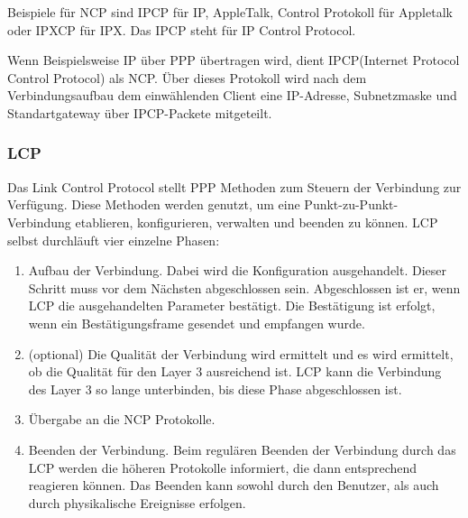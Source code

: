 \documentclass[12pt, a4paper, ngerman]{article}
\begin{document}
Beispiele für NCP sind IPCP für IP, AppleTalk, Control Protokoll für Appletalk oder IPXCP für IPX. Das IPCP steht für IP Control Protocol.

Wenn Beispielsweise IP über PPP übertragen wird, dient IPCP(Internet Protocol Control Protocol) als NCP. Über dieses Protokoll wird nach dem Verbindungsaufbau dem einwählenden Client eine IP-Adresse, Subnetzmaske und Standartgateway über IPCP-Packete mitgeteilt. 

\subsubsection{LCP \label{lcp_operationen}}

Das Link Control Protocol stellt PPP Methoden zum Steuern der Verbindung zur Verfügung. Diese Methoden werden genutzt, um eine Punkt-zu-Punkt-Verbindung  etablieren, konfigurieren, verwalten und  beenden zu können.
LCP selbst durchläuft vier einzelne Phasen:
\begin{enumerate}
	\item Aufbau der Verbindung. Dabei wird die Konfiguration ausgehandelt. Dieser Schritt muss vor dem Nächsten abgeschlossen sein. Abgeschlossen ist er, wenn LCP die ausgehandelten Parameter bestätigt. Die Bestätigung ist erfolgt, wenn ein Bestätigungsframe gesendet und empfangen wurde.
	\item (optional)  Die Qualität der Verbindung wird ermittelt und es wird ermittelt, ob die Qualität für den Layer 3 ausreichend ist. LCP kann die Verbindung des Layer 3 so lange unterbinden, bis diese Phase abgeschlossen ist. 
	\item Übergabe an die NCP Protokolle.   
	\item Beenden der Verbindung. Beim regulären Beenden der Verbindung durch das LCP werden die höheren Protokolle informiert, die dann entsprechend reagieren können. Das Beenden kann sowohl durch den Benutzer, als auch durch physikalische Ereignisse erfolgen. 
\end{enumerate}
\end{document}
